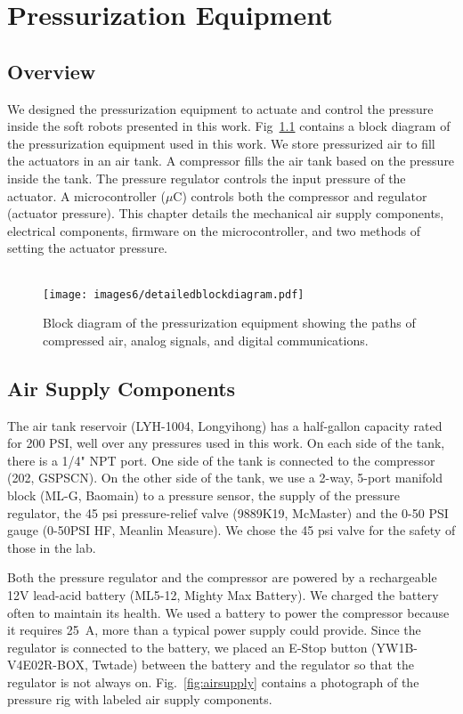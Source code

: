 \chapter{Pressurization Equipment}

\section{Overview}

We designed the pressurization equipment to actuate and control the pressure inside the soft robots presented in this work. Fig~\ref{fig:blockdiagram} contains a block diagram of the pressurization equipment used in this work. We store pressurized air to fill the actuators in an air tank. A compressor fills the air tank based on the pressure inside the tank. The pressure regulator controls the input pressure of the actuator. A microcontroller ($\mu$C) controls both the compressor and regulator (actuator pressure). This chapter details the mechanical air supply components, electrical components, firmware on the microcontroller, and two methods of setting the actuator pressure. \\ \\

\begin{figure}[!ht]
    \centering
    \texttt{[image: images6/detailedblockdiagram.pdf]}
    \caption{Block diagram of the pressurization equipment showing the paths of compressed air, analog signals, and digital communications.}
    \label{fig:blockdiagram}
\end{figure}

\section{Air Supply Components}

The air tank reservoir (LYH-1004, Longyihong) has a half-gallon capacity rated for 200 PSI, well over any pressures used in this work. On each side of the tank, there is a 1/4" NPT port. One side of the tank is connected to the compressor (202, GSPSCN). On the other side of the tank, we use a 2-way, 5-port manifold block (ML-G, Baomain) to a pressure sensor, the supply of the pressure regulator, the 45 psi pressure-relief valve (9889K19, McMaster) and the 0-50 PSI gauge (0-50PSI HF, Meanlin Measure). We chose the 45 psi valve for the safety of those in the lab.

Both the pressure regulator and the compressor are powered by a rechargeable 12V lead-acid battery (ML5-12, Mighty Max Battery). We charged the battery often to maintain its health. We used a battery to power the compressor because it requires 25~A, more than a typical power supply could provide. Since the regulator is connected to the battery, we placed an E-Stop button (YW1B-V4E02R-BOX, Twtade) between the battery and the regulator so that the regulator is not always on. Fig.~\ref{fig:airsupply} contains a photograph of the pressure rig with labeled air supply components. 


